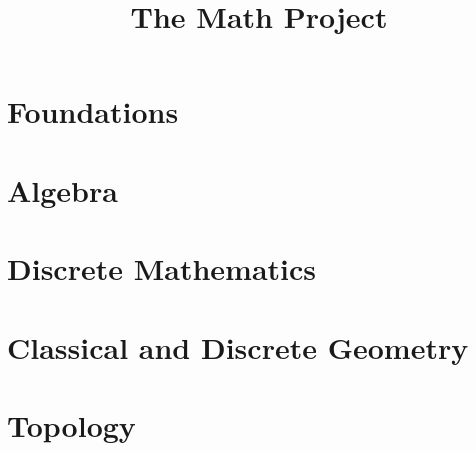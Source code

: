 \documentclass[11pt,openany]{book}
\title{The Math Project}
\author{}
\date{}
\begin{document}
\ifplastex\else
  \maketitle
  \tableofcontents
\fi



\part{Foundations}\label{part-foundations}







\part{Algebra}\label{part-algebra}










\part{Discrete Mathematics}\label{part-discrete-mathematics}





\part{Classical and Discrete Geometry}\label{part-geometry}



\part{Topology}\label{part-topology}










\end{document}
